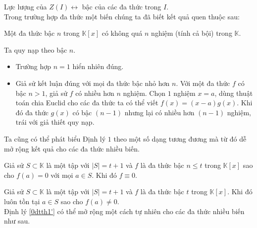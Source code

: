 Lực lượng của $Z(I) \longleftrightarrow $ bậc của các đa thức trong $I$. \\
Trong trường hợp đa thức một biến chúng ta đã biết kết quả quen thuộc sau:
\begin{dl}\label{0dtth1}
Một đa thức bậc $n$ trong $\mathbb{K}[x]$ có không quá $n$ nghiệm (tính cả bội) trong $\mathbb{K}$.
\end{dl}
 Ta quy nạp theo bậc $n$.
\begin{itemize}
	\item Trường hợp $n=1$ hiển nhiên đúng.
	\item Giả sử kết luận đúng với mọi đa thức bậc nhỏ hơn $n$. Với một đa thức $f$ có bậc $n>1$, giả sử $f$ có nhiều hơn $n$ nghiệm. Chọn $1$ nghiệm $x=a$, dùng thuật toán chia Euclid cho các đa thức ta có thể viết $f(x)=(x-a)g(x)$. Khi đó đa thức $g(x)$ có bậc $(n-1)$ nhưng lại có nhiều hơn $(n-1)$ nghiệm, trái với giả thiết quy nạp.
\end{itemize}
Ta cũng có thể phát biểu Định lý $1$ theo một số dạng tương đương mà từ đó dễ mở rộng kết quả cho các đa thức nhiều biến.
\begin{dl}\label{0dtth1'}
Giả sử $S \subset \mathbb{K}$ là một tập với $|S|=t+1$ và $f$ là đa thức bậc $n \leq t$ trong $\mathbb{K}[x]$ sao cho $f(a)=0$ với mọi $a\in S$. Khi đó $f\equiv 0$.
\end{dl}
\begin{dl}\label{0dtth1''}
	Giả sử $S \subset \mathbb{K}$ là một tập với  $|S|=t+1$ và $f$ là đa thức bậc $t$ trong $\mathbb{K}[x]$. Khi đó luôn tồn tại $a\in S$ sao cho $f(a)\neq  0$.\\
	Định lý \ref{0dtth1'} có thể mở rộng một cách tự nhiên cho các đa thức nhiều biến như sau.
\end{dl}

